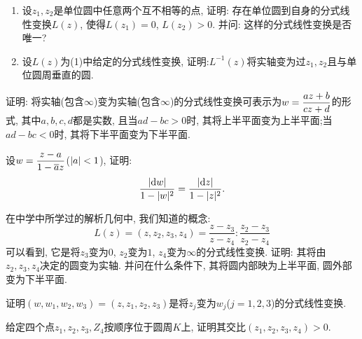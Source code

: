 \begin{yyEx}
    \begin{enumerate}
        \item 设$z_1,z_2$是单位圆中任意两个互不相等的点, 证明: 存在单位圆到自身的分式线性变换$L(z)$, 使得$L(z_1) = 0$, $L(z_2)>0$. 并问: 这样的分式线性变换是否唯一?
        \item 设$L(z)$为(1)中给定的分式线性变换, 证明:$L^{-1}(z)$将实轴变为过$z_1,z_2$且与单位圆周垂直的圆.
    \end{enumerate}
\end{yyEx}

\begin{yyEx}
    证明: 将实轴(包含$\infty$)变为实轴(包含$\infty$)的分式线性变换可表示为$\begin{lgathered}w = \frac{az+b}{cz+d}\end{lgathered}$的形式, 其中$a,b,c,d$都是实数, 且当$ad-bc>0$时, 其将上半平面变为上半平面;当$ad-bc<0$时, 其将下半平面变为下半平面.
\end{yyEx}

\begin{yyEx}
    设$\begin{lgathered}w = \frac{z-a}{1-\overline{a}z}\end{lgathered}$($\lvert a\rvert<1$), 证明:
    \begin{equation*}
        \frac{\lvert\mathrm{d}w\rvert}{1-\lvert w\rvert^2} = \frac{\lvert\mathrm{d}z\rvert}{1-\lvert z\rvert^2}.
    \end{equation*}
\end{yyEx}

\begin{yyEx}
    在中学中所学过的解析几何中, 我们知道的概念:
    \begin{equation*}
        L(z) = (z,z_2,z_3,z_4) =  \frac{z-z_3}{z-z_4}:\frac{z_2-z_3}{z_2-z_4}
    \end{equation*}
    可以看到, 它是将$z_3$变为$0$, $z_2$变为$1$, $z_4$变为$\infty$的分式线性变换. 证明: 其将由$z_2,z_3,z_4$决定的圆变为实轴. 并问在什么条件下, 其将圆内部映为上半平面, 圆外部变为下半平面.
\end{yyEx}

\begin{yyEx}
    证明$(w,w_1,w_2,w_3) = (z,z_1,z_2,z_3)$是将$z_j$变为$w_j$($j=1,2,3$)的分式线性变换.
\end{yyEx}

\begin{yyEx}
    给定四个点$z_1,z_2,z_3,Z_4$按顺序位于圆周$K$上, 证明其交比$(z_1,z_2,z_3,z_4)>0$.
\end{yyEx}

